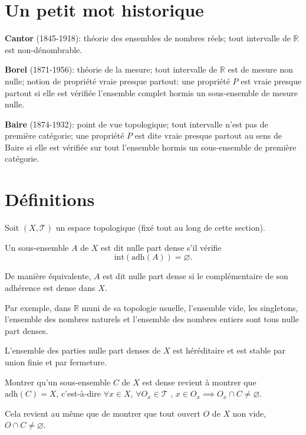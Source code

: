 \section{Un petit mot historique}
\textbf{Cantor} (1845-1918): théorie des ensembles de nombres réels;
tout intervalle de $\mathbb{R}$ est non-dénombrable.

\textbf{Borel} (1871-1956): théorie de la mesure; tout intervalle
de $\mathbb{R}$ est de mesure non nulle; notion de propriété vraie
presque partout: une propriété $P$ est vraie presque partout si
elle est vérifiée l'ensemble complet hormis un sous-ensemble de mesure
nulle.

\textbf{Baire} (1874-1932): point de vue topologique; tout intervalle
n'est pas de première catégorie; une propriété $P$ est dite
vraie presque partout au sens de Baire si elle est vérifiée sur tout
l'ensemble hormis un sous-ensemble de première catégorie.

\section{Définitions}

Soit $(X, \mathcal{T})$ un espace topologique (fixé tout au long de cette
section).

\begin{df}
  Un sous-ensemble $A$ de $X$ est dit nulle part dense s'il vérifie
  $$\mathrm{int}\left(\mathrm{adh}(A)\right) = \varnothing.$$

  De manière équivalente, $A$ est dit nulle part dense si le complémentaire
  de son adhérence est dense dans $X$.
\end{df}

Par exemple, dans $\mathbb{R}$ muni de sa topologie usuelle, l'ensemble
vide, les singletons, l'ensemble des nombres naturels et l'ensemble des
nombres entiers sont tous nulle part denses.

\begin{prop}
  L'ensemble des parties nulle part denses de $X$ est héréditaire et
  est stable par union finie  et par fermeture.
\end{prop}

\begin{rem}
  Montrer qu'un sous-ensemble $C$ de $X$ est dense revient à
  montrer que $\mathrm{adh}(C) = X$, c'est-à-dire
  $\forall x\in X$, $\forall O_x\in\mathcal{T}$ , $x\in O_x\implies O_x\cap C\neq
  \varnothing$.

  Cela revient au même que de montrer que tout ouvert $O$ de $X$ non vide,
  $O\cap C\neq \varnothing$.
\end{rem}

